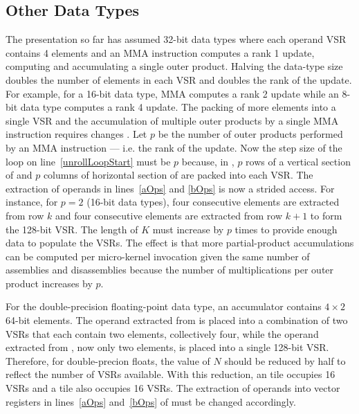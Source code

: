 \documentclass[\main/thesis.tex]{subfiles}
\begin{document}
\subsection{Other Data Types}
\label{sec:dataTypes}
The presentation so far has assumed 32-bit data types where each operand VSR contains 4 elements and an MMA instruction computes a rank 1 update, computing and accumulating a single outer product.
Halving the data-type size doubles the number of elements in each VSR and doubles the rank of the update.
For example, for a 16-bit data type, MMA computes a rank 2 update while an 8-bit data type computes a rank 4 update.
The packing of more elements into a single VSR and the accumulation of multiple outer products by a single MMA instruction requires changes .
Let $p$ be the number of outer products performed by an MMA instruction --- i.e. the rank of the update.
Now the step size of the loop on line~\ref{unrollLoopStart} must be $p$ because, in , $p$ rows of a vertical section of  and $p$ columns of horizontal section of  are packed into each VSR.
The extraction of operands in lines~\ref{aOps} and \ref{bOps} is now a strided access.
For instance, for $p=2$ (16-bit data types), four consecutive elements are extracted from row $k$ and four consecutive elements are extracted from row $k+1$ to form the 128-bit VSR.
The length of $K$ must increase by $p$ times to provide enough data to populate the VSRs.
The effect is that more partial-product accumulations can be computed per micro-kernel invocation given the same number of assemblies and disassemblies because the number of multiplications per outer product increases by $p$.

For the double-precision floating-point data type, an accumulator contains $4 \times 2$ 64-bit elements.
The operand extracted from  is placed into a combination of two VSRs that each contain two elements, collectively four, while the operand extracted from , now only two elements, is placed into a single 128-bit VSR.
Therefore, for double-precion floats, the value of $N$ should be reduced by half to reflect the number of VSRs available.
With this reduction, an  tile occupies 16 VSRs and a  tile also occupies 16 VSRs.
The extraction of operands into vector registers in lines~\ref{aOps} and~\ref{bOps} of  must be changed accordingly.
\end{document}
